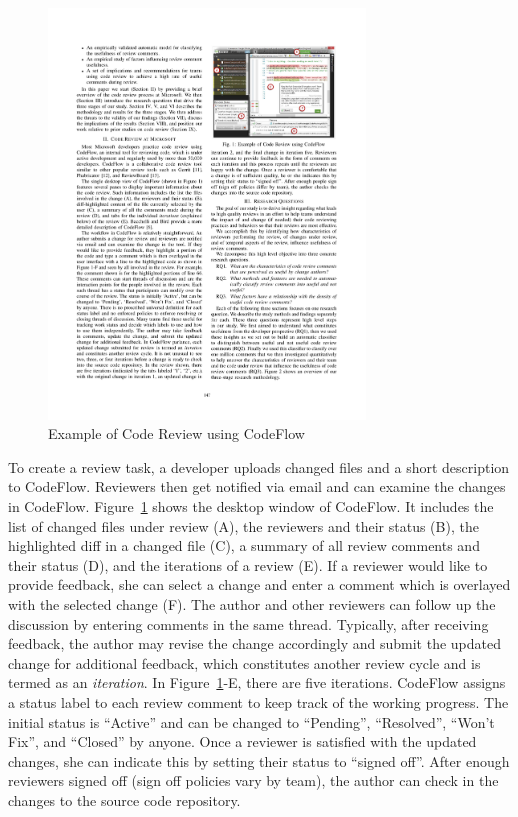 \documentclass[runningheads,a4paper]{llncs}
\begin{document}
\begin{figure}[ht]
 \centering
 \includegraphics[width=0.75\textwidth]{images/codeflow.pdf}
 \caption{Example of Code Review using CodeFlow~\cite{bosu2015characteristics}}
 \label{fig:codeflow}
\end{figure}

To create a review task, a developer uploads changed files and a short description to CodeFlow. Reviewers then get notified via email and can examine the changes in CodeFlow. Figure~\ref{fig:codeflow} shows the desktop window of CodeFlow. It includes the list of changed files under review (A), the reviewers and their status (B), the highlighted diff in a changed file (C), a summary of all review comments and their status (D), and the iterations of a review (E). If a reviewer would like to provide feedback, she can select a change and enter a comment which is overlayed with the selected change (F). The author and other reviewers can follow up the discussion by entering comments in the same thread. Typically, after receiving feedback, the author may revise the change accordingly and submit the updated change for additional feedback, which constitutes another review cycle and is termed as an {\em iteration}. In Figure~\ref{fig:codeflow}-E, there are five iterations. CodeFlow assigns a status label to each review comment to keep track of the working progress. The initial status is ``Active'' and can be changed to ``Pending'', ``Resolved'', ``Won't Fix'', and ``Closed'' by anyone. Once a reviewer is satisfied with the updated changes, she can indicate this by setting their status to ``signed off''. After enough reviewers signed off (sign off policies vary by team), the author can check in the changes to the source code repository.
\end{document}
